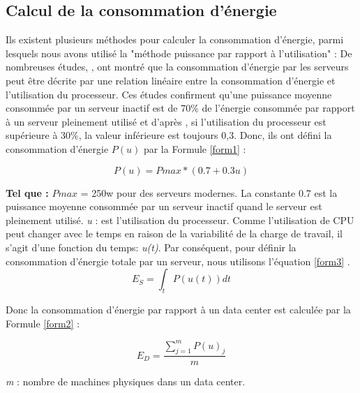 \subsection{Calcul de la consommation d'énergie}
\begin{onehalfspace}

Ils existent plusieurs méthodes pour calculer la consommation d'énergie, parmi lesquels
nous avons utilisé la "méthode puissance par rapport à l'utilisation" : De nombreuses études, \cite{ref34}, \cite{ref35} ont montré que la consommation d'énergie par les serveurs peut être décrite par une relation linéaire entre la consommation d'énergie et l'utilisation du processeur. Ces études confirment qu'une puissance moyenne consommée par un serveur inactif est de 70\% de l'énergie consommée par rapport à un serveur pleinement utilisé et d'après \cite{ref36} , si l'utilisation du processeur est supérieure à 30\%, la valeur inférieure est toujours 0,3. Donc, ils ont défini la consommation d'énergie $P(u)$ par la Formule \ref{form1} :\bigskip

\begin{equation}
P(u) = Pmax \ast (0.7 + 0.3u)
\label{form1}
\end{equation}
\bigskip

\textbf{Tel que :}
$Pmax$ = 250w pour des serveurs modernes. La constante 0.7 est la puissance moyenne consommée par un serveur inactif quand le serveur est pleinement utilisé. \textit{u} : est l'utilisation du processeur. Comme l'utilisation de CPU peut changer avec le temps en raison de la variabilité de la charge de travail, il s'agit d'une fonction du temps: \textit{u(t)}. Par conséquent, pour définir la consommation d'énergie totale par un serveur, nous utilisons l'équation \ref{form3} \bigskip .\bigskip
\begin{equation}
E_{S} = \int_{t} {P(u(t)) dt}
\label{form3}
\end{equation}
\bigskip

Donc la consommation d'énergie par rapport à un data center est calculée par la Formule \ref{form2} \cite{ref37} : \bigskip

\begin{equation}
E_{D} = \frac{\sum_{j=1}^{m} P(u)_j}{m}
\label{form2}
\end{equation}
\bigskip

\textit{m} : nombre de machines physiques dans un data center.
\end{onehalfspace}
